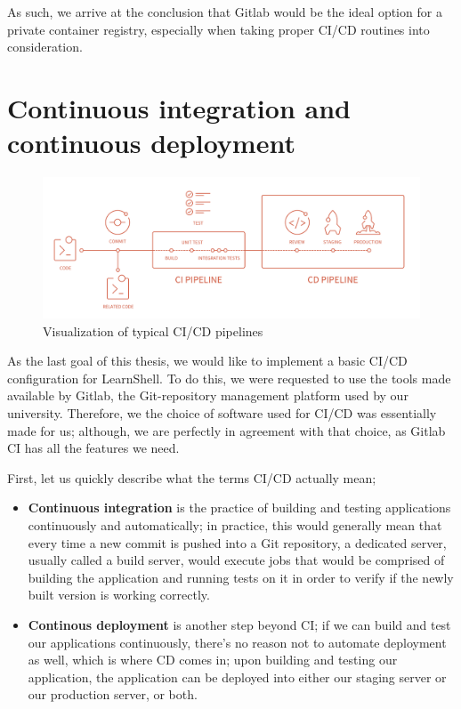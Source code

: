 \documentclass[thesis=B,english]{FITthesis}[2019/12/23]
\begin{document}
As such, we arrive at the conclusion that Gitlab would be the ideal option for a private container registry, especially when taking proper CI/CD routines into consideration.

\section{Continuous integration and continuous deployment}

\begin{figure}[H]
\centering
\caption{Visualization of typical CI/CD pipelines \cite{cicd-diagram}}
\hspace*{-2cm}
\includegraphics[scale=0.3]{cicd}
\end{figure}

As the last goal of this thesis, we would like to implement a basic CI/CD configuration for LearnShell. To do this, we were requested to use the tools made available by Gitlab, the Git-repository management platform used by our university. Therefore, we the choice of software used for CI/CD was essentially made for us; although, we are perfectly in agreement with that choice, as Gitlab CI has all the features we need.

First, let us quickly describe what the terms CI/CD actually mean;

\begin{itemize}
  \setlength\itemsep{0em}
  \item \textbf{Continuous integration} is the practice of building and testing applications continuously and automatically; in practice, this would generally mean that every time a new commit is pushed into a Git repository, a dedicated server, usually called a build server, would execute jobs that would be comprised of building the application and running tests on it in order to verify if the newly built version is working correctly.
  \item \textbf{Continous deployment} is another step beyond CI; if we can build and test our applications continuously, there's no reason not to automate deployment as well, which is where CD comes in; upon building and testing our application, the application can be deployed into either our staging server or our production server, or both. \cite{cd-guide}
\end{itemize}
 
\end{document}
